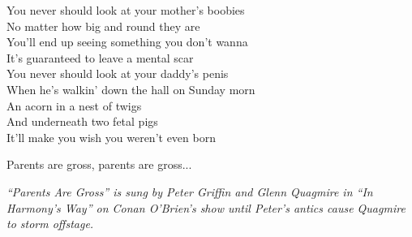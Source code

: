 \vspace{10pt}
You never should look at your mother's boobies\\
No matter how big and round they are\\
You'll end up seeing something you don't wanna\\
It's guaranteed to leave a mental scar\\
You never should look at your daddy's penis\\
When he's walkin' down the hall on Sunday morn\\
An acorn in a nest of twigs\\
And underneath two fetal pigs\\
It'll make you wish you weren't even born\par
\vspace{10pt}
Parents are gross, parents are gross...
\par
\vspace{10pt}
{\footnotesize\textit{``Parents Are Gross'' is sung by Peter Griffin and Glenn Quagmire in ``In Harmony's Way'' on Conan O'Brien's show until Peter's antics cause Quagmire to storm offstage.}}
